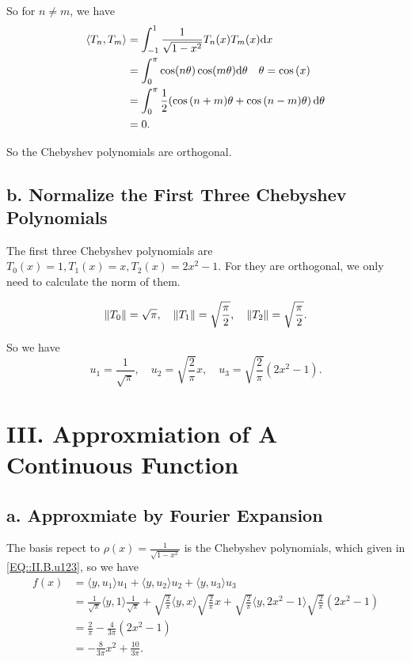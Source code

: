 \documentclass[a4paper]{article}
\begin{document}
So for $n \neq m$, we have
\begin{equation}
    \begin{aligned}
        \langle T_n, T_m \rangle &= \int_{-1}^{1} \frac{1}{\sqrt{1-x^2}} T_n(x) T_m(x) \mathrm{d}x \\
        &= \int_{0}^{\pi} \cos(n \theta) \cos(m \theta) \mathrm{d} \theta \quad \theta = \cos\qty(x) \\
        &= \int_{0}^{\pi} \frac{1}{2} (\cos\qty(n+m)\theta + \cos\qty(n-m) \theta ) \,\mathrm{d}\theta \\
        &= 0.
    \end{aligned}
\end{equation}

So the Chebyshev polynomials are orthogonal.

\subsection*{b. Normalize the First Three Chebyshev Polynomials}

The first three Chebyshev polynomials are $T_0(x) = 1, T_1(x) = x, T_2(x) = 2x^2 - 1$. For they are orthogonal, we only need to calculate the norm of them.

\begin{equation}
    \norm{T_0} = \sqrt{\pi}, \quad \norm{T_1} = \sqrt{\frac{\pi}{2}}, \quad \norm{T_2} = \sqrt{\frac{\pi}{2}}.
\end{equation}

So we have
\begin{equation}
    u_1 = \frac{1}{\sqrt{\pi}}, \quad u_2 = \sqrt{\frac{2}{\pi}} x, \quad u_3 = \sqrt{\frac{2}{\pi}} (2x^2 - 1).
    \label{EQ::II.B.u123}
\end{equation}

\section*{III. Approxmiation of A Continuous Function}

\subsection*{a. Approxmiate by Fourier Expansion}

The basis repect to $\rho(x) = \frac{1}{\sqrt{1-x^2}}$ is the Chebyshev polynomials, which given in \ref{EQ::II.B.u123}, so we have
\begin{equation}
    \begin{aligned}
        f(x) &= \langle y, u_1 \rangle u_1 + \langle y, u_2 \rangle u_2 + \langle y, u_3 \rangle u_3 \\
        &= \frac{1}{\sqrt{\pi}} \langle y, 1 \rangle \frac{1}{\sqrt{\pi}} + \sqrt{\frac{2}{\pi}} \langle y, x \rangle \sqrt{\frac{2}{\pi}} x + \sqrt{\frac{2}{\pi}} \langle y, 2x^2 - 1 \rangle \sqrt{\frac{2}{\pi}} (2x^2 - 1) \\
        &= \frac{2}{\pi} - \frac{4}{3 \pi} (2x^2 - 1) \\
        &= -\frac{8}{3 \pi} x^2 + \frac{10}{3 \pi}. 
    \end{aligned}
\end{equation}
\end{document}
